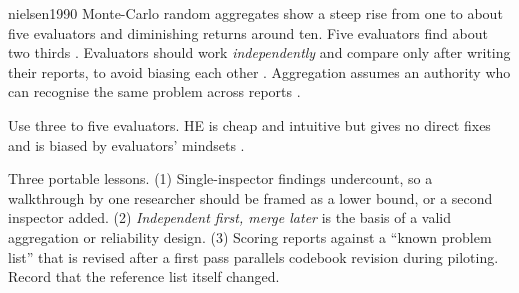 \begin{papercard}{nielsen1990}
 Monte-Carlo random aggregates show a steep rise from one to about five evaluators and diminishing returns around ten. Five evaluators find about two thirds . Evaluators should work \emph{independently} and compare only after writing their reports, to avoid biasing each other . Aggregation assumes an authority who can recognise the same problem across reports .

 Use three to five evaluators. HE is cheap and intuitive but gives no direct fixes and is biased by evaluators' mindsets .

 Three portable lessons. (1) Single-inspector findings undercount, so a walkthrough by one researcher should be framed as a lower bound, or a second inspector added. (2) \emph{Independent first, merge later} is the basis of a valid aggregation or reliability design. (3) Scoring reports against a ``known problem list'' that is revised after a first pass parallels codebook revision during piloting. Record that the reference list itself changed.
\end{papercard}
